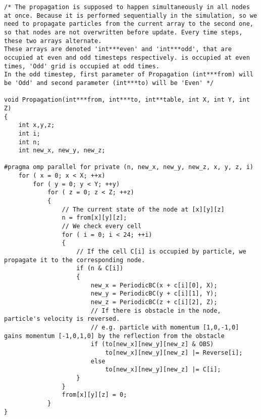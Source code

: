 \begin{lstlisting}
/* The propagation is supposed to happen simultaneously in all nodes at once. Because it is performed sequentially in the simulation, so we need to propagate particles from the current array to the second one, so that nodes are not overwritten before update. Every time steps, these two arrays alternate.
These arrays are denoted 'int***even' and 'int***odd', that are occupied at even and odd timesteps respectively. is occupied at even times, 'Odd' grid is occupied at odd times. 
In the odd timestep, first parameter of Propagation (int***from) will be 'Odd' and second parameter (int***to) will be 'Even' */

void Propagation(int***from, int***to, int**table, int X, int Y, int Z)
{
	int x,y,z;
	int i;
	int n;
	int new_x, new_y, new_z;

#pragma omp parallel for private (n, new_x, new_y, new_z, x, y, z, i)
	for ( x = 0; x < X; ++x)
		for ( y = 0; y < Y; ++y)
			for ( z = 0; z < Z; ++z)
			{
				// The current state of the node at [x][y][z]				
				n = from[x][y][z];
				// We check every cell
				for ( i = 0; i < 24; ++i)
				{
					// If the cell C[i] is occupied by particle, we propagate it to the corresponding node. 
					if (n & C[i])
					{
						new_x = PeriodicBC(x + c[i][0], X);
						new_y = PeriodicBC(y + c[i][1], Y);
						new_z = PeriodicBC(z + c[i][2], Z);
						// If there is obstacle in the node, particle's velocity is reversed.
						// e.g. particle with momentum [1,0,-1,0] gains momentum [-1,0,1,0] by the reflection from the obstacle
						if (to[new_x][new_y][new_z] & OBS)
							to[new_x][new_y][new_z] |= Reverse[i];
						else
							to[new_x][new_y][new_z] |= C[i];
					}
				}
				from[x][y][z] = 0;
			}
}
\end{lstlisting}
